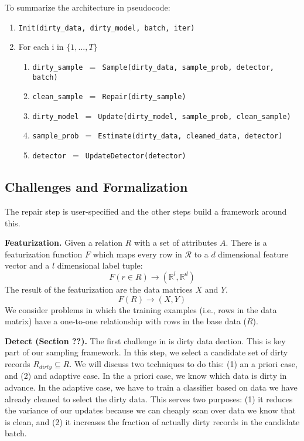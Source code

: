 To summarize the architecture in pseudocode:
\begin{enumerate}\scriptsize\sloppy
\item \texttt{Init(dirty\_data, dirty\_model, batch, iter)}
\item For each i in $\{1,...,T\}$
\begin{enumerate}
	\item \texttt{dirty\_sample $=$ Sample(dirty\_data, sample\_prob, detector, batch)}
	\item \texttt{clean\_sample $=$ Repair(dirty\_sample)}
	\item \texttt{dirty\_model $=$ Update(dirty\_model, sample\_prob, clean\_sample)}
	\item \texttt{sample\_prob $=$ Estimate(dirty\_data, cleaned\_data, detector)}
	\item \texttt{detector $=$ UpdateDetector(detector)}
\end{enumerate}
\end{enumerate}

\subsection{Challenges and Formalization}
The repair step is user-specified and the other steps build a framework around this. 

\vspace{0.5em}

\noindent \textbf{Featurization. } Given a relation $R$ with a set of attributes $A$.
There is a featurization function $F$ which maps every row in $\mathcal{R}$ to a $d$ dimensional feature vector and a $l$ dimensional label tuple: 
\[F(r \in R) \rightarrow (\mathbb{R}^l, \mathbb{R}^d)\]
The result of the featurization are the data matrices $X$ and $Y$.
\[
F(R)\rightarrow (X,Y)
\]
We consider problems in which the training examples (i.e., rows in the data matrix) have a one-to-one relationship with rows in the base data ($R$).

\vspace{0.5em}

\noindent\textbf{Detect (Section ??). } The first challenge in \sys is dirty data dection. This is key part of our sampling framework. In this step, we select a candidate set of dirty records $R_{dirty} \subseteq R$. We will discuss two techniques to do this: (1) an a priori case, and (2) and adaptive case. In the a priori case, we know which data is dirty in advance. In the adaptive case, we have to train a classifier based on data we have already cleaned to select the dirty data. This serves two purposes: (1) it reduces the variance of our updates because we can cheaply scan over data we know that is clean, and (2) it increases the fraction of actually dirty records in the candidate batch.

